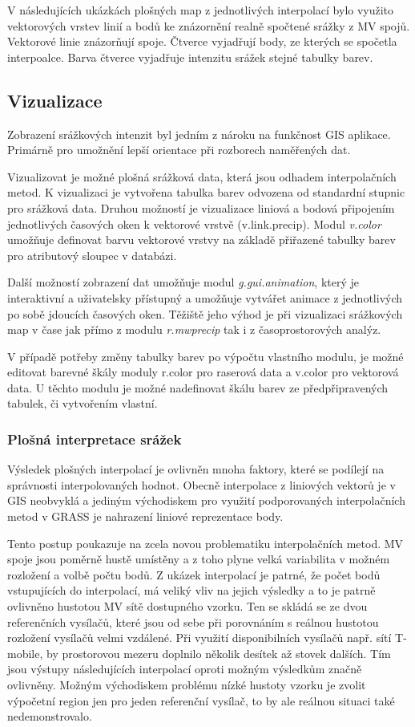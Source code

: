 \documentclass[a4paper,12pt,oneside]{report}
\begin{document}
V následujících ukázkách plošných map z jednotlivých interpolací bylo využito vektorových vrstev linií a bodů ke znázornění realně spočtené srážky z MV spojů. Vektorové linie znázorňují spoje. Čtverce vyjadřují body, ze kterých se spočetla interpoalce. Barva čtverce vyjadřuje intenzitu srážek stejné tabulky barev. 


\subsection{Vizualizace}
Zobrazení srážkových intenzit byl jedním z nároku na funkčnost GIS aplikace. Primárně pro umožnění  lepší orientace při rozborech naměřených dat.

Vizualizovat je možné plošná srážková data, která jsou odhadem interpolačních metod. K vizualizaci je vytvořena tabulka barev odvozena od standardní  stupnic pro srážková data. Druhou možností je vizualizace liniová a bodová připojením jednotlivých časových oken k vektorové vrstvě (v.link.precip). Modul \textit{v.color} umožňuje definovat barvu vektorové vrstvy na základě přiřazené tabulky barev pro atributový sloupec v databázi.

Další možností zobrazení dat umožňuje modul \textit{g.gui.animation}, který je interaktivní a uživatelsky přístupný a umožňuje vytvářet animace z jednotlivých po sobě jdoucích časových oken. Těžiště jeho výhod je při vizualizaci srážkových map v čase jak přímo z modulu \textit{r.mwprecip} tak i z časoprostorových analýz. 

V případě potřeby změny tabulky barev po výpočtu vlastního modulu, je možné editovat barevné škály moduly r.color pro raserová data a v.color pro vektorová data. U těchto modulu je možné nadefinovat škálu barev ze předpřipravených tabulek, či vytvořením vlastní.


\subsubsection{Plošná interpretace srážek}
Výsledek plošných interpolací  je ovlivněn mnoha faktory, které se podílejí na správnosti interpolovaných  hodnot. Obecně interpolace z liniových vektorů je v GIS neobvyklá a jediným východiskem pro využití podporovaných interpolačních metod v GRASS je nahrazení liniové reprezentace body.

Tento postup poukazuje na zcela novou problematiku interpolačních metod. MV spoje jsou poměrně hustě umístěny a z toho plyne velká variabilita v možném rozložení a volbě počtu bodů. Z ukázek interpolací je patrné, že počet bodů vstupujících do interpolací, má veliký vliv na jejich výsledky a to je patrně ovlivněno hustotou MV sítě dostupného vzorku. Ten se skládá se ze dvou referenčních vysílačů, které jsou od sebe při porovnáním s reálnou  hustotou rozložení vysílačů velmi vzdálené. Při využití disponibilních vysílačů např.  sítí T-mobile, by prostorovou mezeru doplnilo několik desítek až stovek dalších. Tím jsou výstupy následujících interpolací oproti možným výsledkům značně ovlivněny. Možným východiskem  problému nízké hustoty vzorku je zvolit výpočetní region jen pro jeden referenční vysílač, to by ale reálnou situaci také nedemonstrovalo.
\end{document}
